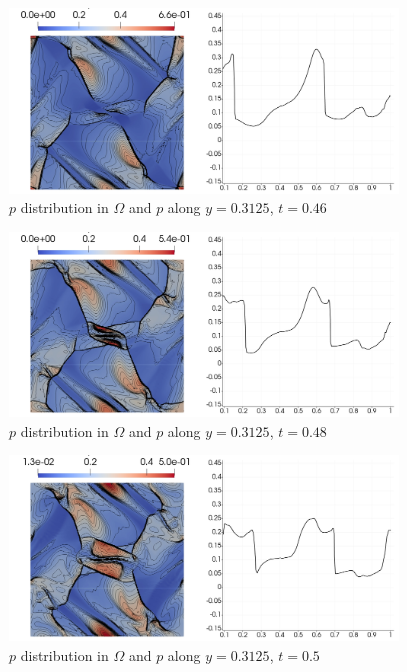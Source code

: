 \begin{figure}[H]
	\centering
	\includegraphics[width=0.92\textwidth]{img/ot/my5new.jpg}
\vspace{-2mm}
\caption{$p$ distribution in $\Omega$ and $p$ along $y = 0.3125$, $t = 0.46$}
\label{figure:myOt5}
\end{figure}
\vspace{-4mm}

\begin{figure}[H]
	\centering
	\includegraphics[width=0.92\textwidth]{img/ot/my6new.jpg}
\vspace{-2mm}
\caption{$p$ distribution in $\Omega$ and $p$ along $y = 0.3125$, $t = 0.48$}
\label{figure:myOt6}
\end{figure}
\vspace{-4mm}

\begin{figure}[H]
	\centering
	\includegraphics[width=0.92\textwidth]{img/ot/my7new.jpg}
\caption{$p$ distribution in $\Omega$ and $p$ along $y = 0.3125$, $t = 0.5$}
\label{figure:myOt7}
\end{figure}

